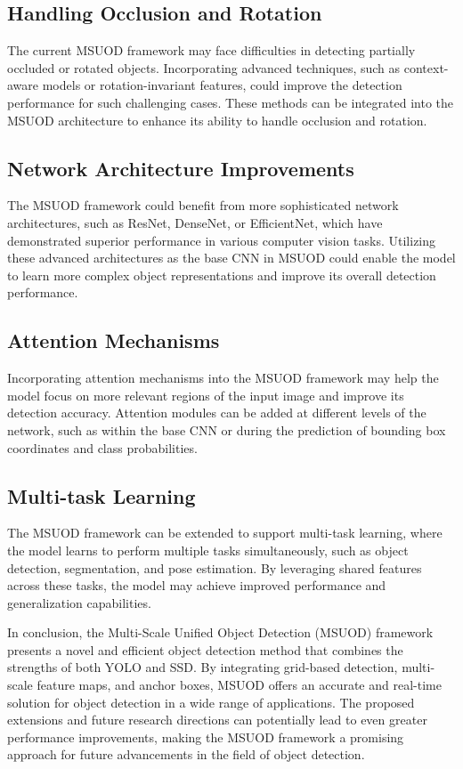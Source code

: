 \documentclass[conference]{IEEEtran}
\begin{document}
\begin{itemize}
\subsection{Handling Occlusion and Rotation}

The current MSUOD framework may face difficulties in detecting partially occluded or rotated objects. Incorporating advanced techniques, such as context-aware models or rotation-invariant features, could improve the detection performance for such challenging cases. These methods can be integrated into the MSUOD architecture to enhance its ability to handle occlusion and rotation.

\subsection{Network Architecture Improvements}

The MSUOD framework could benefit from more sophisticated network architectures, such as ResNet, DenseNet, or EfficientNet, which have demonstrated superior performance in various computer vision tasks. Utilizing these advanced architectures as the base CNN in MSUOD could enable the model to learn more complex object representations and improve its overall detection performance.

\subsection{Attention Mechanisms}

Incorporating attention mechanisms into the MSUOD framework may help the model focus on more relevant regions of the input image and improve its detection accuracy. Attention modules can be added at different levels of the network, such as within the base CNN or during the prediction of bounding box coordinates and class probabilities.

\subsection{Multi-task Learning}

The MSUOD framework can be extended to support multi-task learning, where the model learns to perform multiple tasks simultaneously, such as object detection, segmentation, and pose estimation. By leveraging shared features across these tasks, the model may achieve improved performance and generalization capabilities.


In conclusion, the Multi-Scale Unified Object Detection (MSUOD) framework presents a novel and efficient object detection method that combines the strengths of both YOLO and SSD. By integrating grid-based detection, multi-scale feature maps, and anchor boxes, MSUOD offers an accurate and real-time solution for object detection in a wide range of applications. The proposed extensions and future research directions can potentially lead to even greater performance improvements, making the MSUOD framework a promising approach for future advancements in the field of object detection.


\end{itemize}
\end{document}

